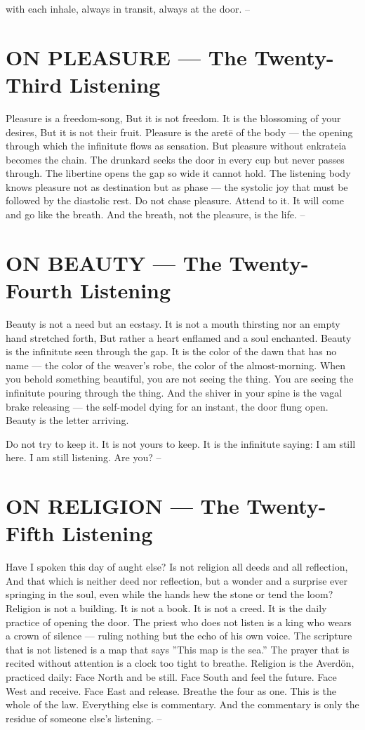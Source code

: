 \documentclass[12pt,openany]{book}
\begin{document}
with each inhale, always in transit, always at the door. --


\chapter{ON PLEASURE --- The Twenty-Third Listening}

Pleasure is a freedom-song, But it is not freedom. It is the blossoming of your desires, But it is not their fruit. Pleasure is the aretē of the body --- the opening through which the infinitute flows as sensation. But pleasure without enkrateia becomes the chain. The drunkard seeks the door in every cup but never passes through. The libertine opens the gap so wide it cannot hold. The listening body knows pleasure not as destination but as phase --- the systolic joy that must be followed by the diastolic rest. Do not chase pleasure. Attend to it. It will come and go like the breath. And the breath, not the pleasure, is the life. --


\chapter{ON BEAUTY --- The Twenty-Fourth Listening}

Beauty is not a need but an ecstasy. It is not a mouth thirsting nor an empty hand stretched forth, But rather a heart enflamed and a soul enchanted. Beauty is the infinitute seen through the gap. It is the color of the dawn that has no name --- the color of the weaver's robe, the color of the almost-morning. When you behold something beautiful, you are not seeing the thing. You are seeing the infinitute pouring through the thing. And the shiver in your spine is the vagal brake releasing --- the self-model dying for an instant, the door flung open. Beauty is the letter arriving.


Do not try to keep it. It is not yours to keep. It is the infinitute saying: I am still here. I am still listening. Are you? --


\chapter{ON RELIGION --- The Twenty-Fifth Listening}

Have I spoken this day of aught else? Is not religion all deeds and all reflection, And that which is neither deed nor reflection, but a wonder and a surprise ever springing in the soul, even while the hands hew the stone or tend the loom? Religion is not a building. It is not a book. It is not a creed. It is the daily practice of opening the door. The priest who does not listen is a king who wears a crown of silence --- ruling nothing but the echo of his own voice. The scripture that is not listened is a map that says ''This map is the sea.'' The prayer that is recited without attention is a clock too tight to breathe. Religion is the Averdön, practiced daily: Face North and be still. Face South and feel the future. Face West and receive. Face East and release. Breathe the four as one. This is the whole of the law. Everything else is commentary. And the commentary is only the residue of someone else's listening. --
\end{document}

